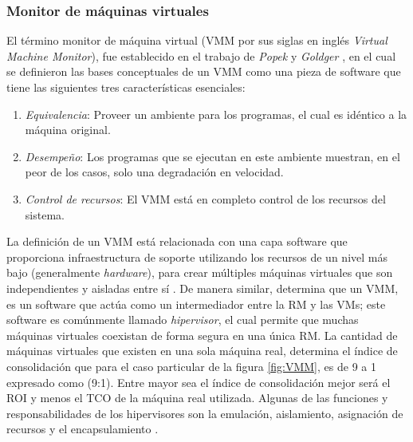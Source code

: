 \subsubsection{Monitor de máquinas virtuales}

El término monitor de máquina virtual (VMM por sus siglas en inglés \textit{Virtual Machine Monitor}), fue establecido en el trabajo de \textit{Popek} y \textit{Goldger} \cite{Popek1974}, en el cual  se definieron las bases conceptuales de un VMM como una pieza de software que tiene las siguientes tres características esenciales: 
\begin{enumerate}
	\item \textit{Equivalencia}: Proveer un ambiente para los programas, el cual es idéntico a la máquina original.\\
	
	\item \textit{Desempeño}: Los programas que se ejecutan en este ambiente muestran, en el peor de los casos, solo una degradación en velocidad.\\
	
	\item \textit{Control de recursos}: El VMM está en completo control de los recursos del sistema.\\ 
\end{enumerate}

La definición de un VMM está relacionada con una capa software que proporciona  infraestructura de soporte utilizando los recursos de un nivel más bajo (generalmente \textit{hardware}), para crear múltiples máquinas virtuales que son independientes y aisladas entre sí \parencite{Chiueh2005, Cafaro2011}. De manera similar, \textcite{Stallings2015}  determina  que un VMM, es un software que actúa como un intermediador entre la RM y las VMs; este software es comúnmente llamado \textit{hipervisor}, el cual permite que muchas máquinas virtuales coexistan de forma segura en una única RM. La cantidad de máquinas virtuales que existen en una sola máquina real, determina el índice de consolidación que para el caso particular de la figura \ref{fig:VMM}, es de 9 a 1 expresado como (9:1). Entre mayor sea el índice de consolidación mejor será el ROI y menos el TCO de la máquina real utilizada. Algunas de las funciones y responsabilidades de los hipervisores son la emulación, aislamiento, asignación de recursos y el encapsulamiento \parencite{Hoopes2009}.

